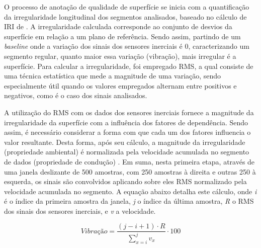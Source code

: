 O processo de anotação de qualidade de superfície se inicia com a quantificação da irregularidade longitudinal dos segmentos analisados, baseado no cálculo de IRI de \cite{Li2018}. A irregularidade calculada corresponde ao conjunto de desvios da superfície em relação a um plano de referência. Sendo assim, partindo de um \textit{baseline} onde a variação dos sinais dos sensores inerciais é 0, caracterizando um segmento regular, quanto maior essa variação (vibração), mais irregular é a superfície. Para calcular a irregularidade, foi empregado RMS, a qual consiste de uma técnica estatística que mede a magnitude de uma variação, sendo especialmente útil quando os valores empregados alternam entre positivos e negativos, como é o caso dos sinais analisados. 

A utilização do RMS com os dados dos sensores inerciais fornece a magnitude da irregularidade da superfície com a influência dos fatores de dependência. Sendo assim, é necessário considerar a forma com que cada um dos fatores influencia o valor resultante. Desta forma, após seu cálculo, a magnitude da irregularidade (propriedade ambiental) é normalizada pela velocidade acumulada no segmento de dados (propriedade de condução) \cite{Li2018}. Em suma, nesta primeira etapa, através de uma janela deslizante de 500 amostras, com 250 amostras à direita e outras 250 à esquerda, os sinais são convolvidos aplicando sobre eles RMS normalizado pela velocidade acumulada no segmento. A equação abaixo detalha este cálculo, onde \emph{i} é o índice da primeira amostra da janela, \emph{j} o índice da última amostra, \emph{R} o RMS dos sinais dos sensores inerciais, e \emph{v} a velocidade.

\begin{center}
  \[
  \textit{Vibração} = \frac{(j - i + 1) \cdot R}{\sum_{x=i}^{j} v_x} \cdot 100
  \]
\end{center}


